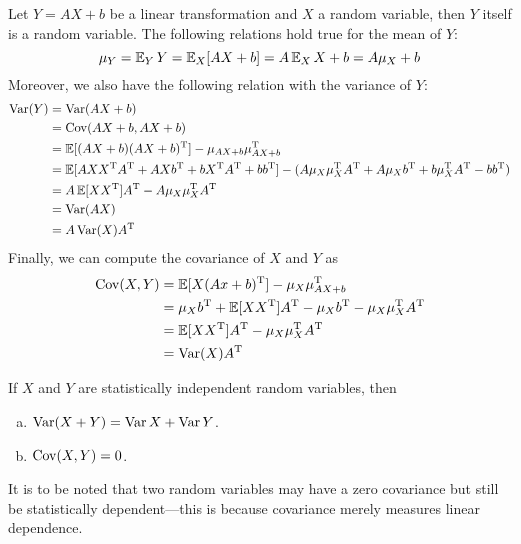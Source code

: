 Let \(Y = A X + b\) be a linear transformation and \(X\) a random variable, then
\(Y\) itself is a random variable. The following relations hold true for the
mean of \(Y\):
\[
\mu_Y = \operatorname{\mathbb{E}}_Y Y = \operatorname{\mathbb{E}}_X[A X + b] = A \operatorname{\mathbb{E}}_X X + b = A \mu_X + b
\]
Moreover, we also have the following relation with the variance of \(Y\):
\begin{align*}
  \operatorname{Var}(Y)
  &= \operatorname{Var}(A X + b) \\
  &= \operatorname{Cov}(A X + b, A X + b) \\
  &= \operatorname{\mathbb{E}}[(A X + b)(A X + b)^{\operatorname{T}}] - \mu_{A X + b} \mu_{A X +
    b}^{\operatorname{T}} \\
  &= \operatorname{\mathbb{E}}[
    A X X^{\operatorname{T}} A^{\operatorname{T}} + A X b^{\operatorname{T}} + b X^{\operatorname{T}} A^{\operatorname{T}}
    + b b^{\operatorname{T}}
    ]
    - (A \mu_X \mu_X^{\operatorname{T}} A^{\operatorname{T}} + A \mu_X b^{\operatorname{T}}
    + b \mu_X^{\operatorname{T}} A^{\operatorname{T}} - b b^{\operatorname{T}}) \\
  &= A \operatorname{\mathbb{E}}[X X^{\operatorname{T}}] A^{\operatorname{T}} - A \mu_X \mu_X^{\operatorname{T}}
    A^{\operatorname{T}} \\
  &= \operatorname{Var}(A X) \\
  &= A \operatorname{Var}(X) A^{\operatorname{T}}
\end{align*}
Finally, we can compute the covariance of \(X\) and \(Y\) as
\begin{align*}
  \operatorname{Cov}(X, Y)
  &= \operatorname{\mathbb{E}}[X (A x + b)^{\operatorname{T}}] - \mu_X \mu_{A X + b}^{\operatorname{T}} \\
  &= \mu_X b^{\operatorname{T}} + \operatorname{\mathbb{E}}[X X^{\operatorname{T}}] A^{\operatorname{T}}
    - \mu_X b^{\operatorname{T}} - \mu_X \mu_X^{\operatorname{T}} A^{\operatorname{T}} \\
  &= \operatorname{\mathbb{E}}[X X^{\operatorname{T}}] A^{\operatorname{T}} - \mu_X \mu_X^{\operatorname{T}} A^{\operatorname{T}} \\
  &= \operatorname{Var}(X) A^{\operatorname{T}}
\end{align*}

\begin{lemma}
\label{lem:statistical-independence-and-cov-var}
If \(X\) and \(Y\) are statistically independent random variables, then
\begin{enumerate}[(a)]\setlength\itemsep{0em}
\item \(\operatorname{Var}(X + Y) = \operatorname{Var} X + \operatorname{Var} Y\).
\item \(\operatorname{Cov}(X, Y) = 0\).
\end{enumerate}
It is to be noted that two random variables may have a zero covariance but
still be statistically dependent---this is because covariance merely measures
linear dependence.
\end{lemma}

